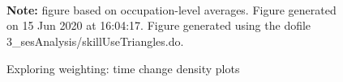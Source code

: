 \begin{figure}[!h]
\caption{Exploring weighting: time change density plots}
 \\  \\  \\ 
\par \begin{minipage}[h]{\textwidth}{\scriptsize\textbf{Note:} figure based on occupation-level averages. Figure generated on 15 Jun 2020 at 16:04:17. Figure generated using the dofile 3\_sesAnalysis/skillUseTriangles.do.}\end{minipage}
\end{figure}
